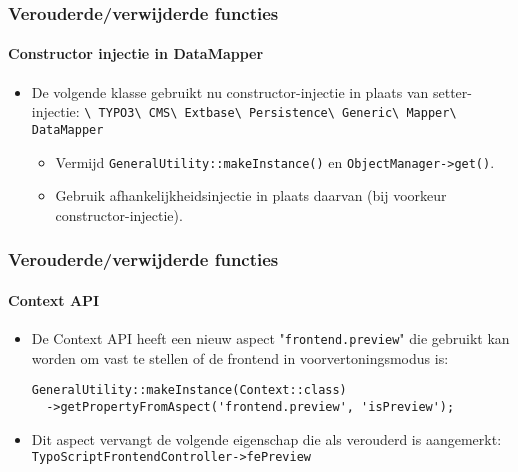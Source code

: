 \begin{frame}[fragile]
	\frametitle{Verouderde/verwijderde functies}
	\framesubtitle{Constructor injectie in DataMapper}

	\begin{itemize}

		\item De volgende klasse gebruikt nu constructor-injectie in plaats van setter-injectie:
			\smaller
				\texttt{\textbackslash
					TYPO3\textbackslash
					CMS\textbackslash
					Extbase\textbackslash
					Persistence\textbackslash
					Generic\textbackslash
					Mapper\textbackslash
					DataMapper}
			\normalsize

			\begin{itemize}\smaller
				\item[\ding{228}] Vermijd \texttt{GeneralUtility::makeInstance()} en \texttt{ObjectManager->get()}.
				\item[\ding{228}] Gebruik afhankelijkheidsinjectie in plaats daarvan (bij voorkeur constructor-injectie).
			\end{itemize}\normalsize

	\end{itemize}

\end{frame}


\begin{frame}[fragile]
	\frametitle{Verouderde/verwijderde functies}
	\framesubtitle{Context API}

	\lstset{basicstyle=\tiny\ttfamily}

	\begin{itemize}

		\item De Context API heeft een nieuw aspect "\texttt{frontend.preview}"
			die gebruikt kan worden om vast te stellen of de frontend in voorvertoningsmodus is:

\begin{lstlisting}
GeneralUtility::makeInstance(Context::class)
  ->getPropertyFromAspect('frontend.preview', 'isPreview');
\end{lstlisting}

		\item Dit aspect vervangt de volgende eigenschap die als verouderd is aangemerkt:
			\small\texttt{TypoScriptFrontendController->fePreview}\normalsize

	\end{itemize}

\end{frame}

